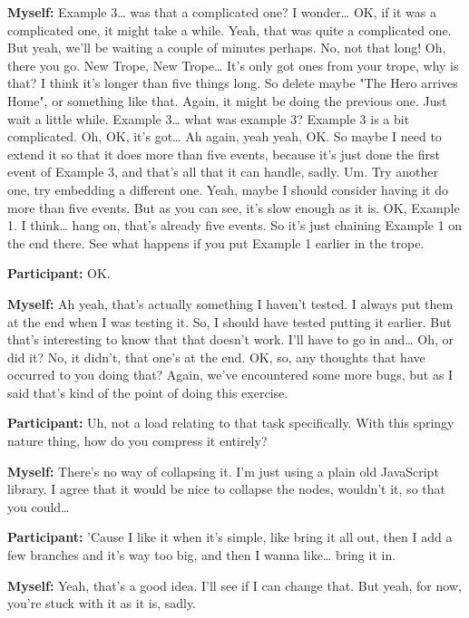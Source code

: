 \documentclass[11pt]{report}
\newcommand{\llabel}[1]{\hypertarget{llineno:#1}{\linelabel{#1}}}
\begin{document}
\begin{linenumbers}
\textbf{Myself:} Example 3\ldots{} was that a complicated one? I wonder\ldots{} OK, if it was a complicated one, it might take a while. Yeah, that was quite a complicated one. But yeah, we'll be waiting a couple of minutes perhaps. No, not that long! Oh, there you go. New Trope, New Trope\ldots{} It's only got ones from your trope, why is that? I think it's longer than five things long. So delete maybe "The Hero arrives Home", or something like that. Again, it might be doing the previous one. Just wait a little while. Example 3\ldots{} what was example 3? Example 3 is a bit complicated. Oh, OK, it's got\ldots{} Ah again, yeah yeah, OK. So maybe I need to extend it so that it does more than five events, because it's just done the first event of Example 3, and that's all that it can handle, sadly. Um. Try another one, try embedding a different one. Yeah, maybe I should consider having it do more than five events. But as you can see, it's slow enough as it is. OK, Example 1. I think\ldots{} hang on, that's already five events. So it's just chaining Example 1 on the end there. See what happens if you put Example 1 earlier in the trope.

\textbf{Participant:} OK.

\textbf{Myself:} Ah yeah, that's actually something I haven't tested. I always
put them at the end when I was testing it. So, I should have tested putting it
earlier. But that's interesting to know that that doesn't work. I'll have to go
in and\ldots{} Oh, or did it? No, it didn't, that one's at the end. OK, so, any
thoughts that have occurred to you doing that? Again, we've encountered some
more bugs, but as I said that's kind of the point of doing this
exercise.\llabel{lne:bug3a}

\textbf{Participant:} Uh, not a load relating to that task specifically. With this springy nature thing, how do you compress it entirely?

\textbf{Myself:} There's no way of collapsing it. I'm just using a plain old JavaScript library. I agree that it would be nice to collapse the nodes, wouldn't it, so that you could\ldots{}

\textbf{Participant:} 'Cause I like it when it's simple, like bring it all out, then I add a few branches and it's way too big, and then I wanna like\ldots{} bring it in.

\textbf{Myself:} Yeah, that's a good idea. I'll see if I can change that. But yeah, for now, you're stuck with it as it is, sadly.


\end{linenumbers}
\end{document}
